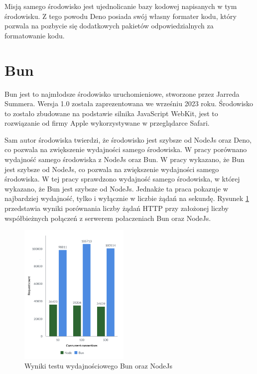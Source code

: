 Misją samego środowisko jest ujednolicanie bazy kodowej napisanych w tym środowisku. Z tego powodu Deno posiada swój własny formater kodu, który pozwala na pozbycie się dodatkowych pakietów odpowiedzialnych za formatowanie kodu. 

\section*{Bun}
Bun \cite{bun} jest to najmłodsze środowisko uruchomieniowe, stworzone przez Jarreda Summera. Wersja 1.0 została zaprezentowana we wrześniu 2023 roku. Środowisko to zostało zbudowane na podstawie silnika JavaScript WebKit, jest to rozwiązanie od firmy Apple wykorzystywane w przeglądarce Safari.

Sam autor środowiska twierdzi, że środowisko jest szybsze od NodeJs oraz Deno, co pozwala na zwiększenie wydajności samego środowiska. W pracy \cite{NodeAndBun} porównano wydajność samego środowiska z NodeJs oraz Bun. W pracy wykazano, że Bun jest szybsze od NodeJs, co pozwala na zwiększenie wydajności samego środowiska. W tej pracy sprawdzono wydajność samego środowiska, w której wykazano, że Bun jest szybsze od NodeJs. Jednakże ta praca pokazuje w najbardziej wydajność, tylko i wyłącznie w liczbie żądań na sekundę. Rysunek \ref{fig:bun_vs_node} przedstawia wyniki porównania liczby żądań HTTP przy założonej liczby współbieżnych połączeń z serwerem połaczeniach Bun oraz NodeJs.

\begin{figure}[H]
  \centering
  \includegraphics[width=0.47\textwidth]{Figures/bun_bench_node.png}
  \caption{Wyniki testu wydajnościowego Bun oraz NodeJs \cite{bun_test}}
  \label{fig:bun_vs_node}
\end{figure}


